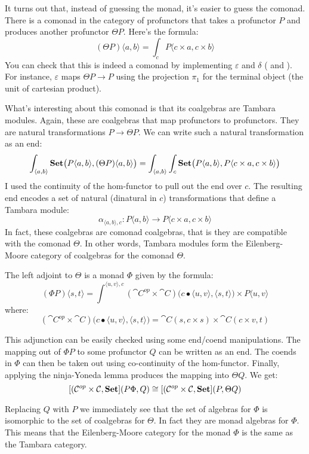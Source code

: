 \documentclass[DaoFP]{subfiles}
\begin{document}
It turns out that, instead of guessing the monad, it's easier to guess the comonad. There is a comonad in the category of profunctors that takes a profunctor $P$ and produces another profunctor $\Theta P$. Here's the formula:
\[(\Theta P) \langle a, b \rangle = \int_c P \langle c \times a, c \times b \rangle \]
You can check that this is indeed a comonad by implementing $\varepsilon$ and $\delta$ ( and ). For instance, $\varepsilon$ maps $\Theta P \to P$ using the projection $\pi_1$ for the terminal object (the unit of cartesian product).

What's interesting about this comonad is that its coalgebras are Tambara modules. Again, these are coalgebras that map profunctors to profunctors. They are natural transformations $P \to \Theta P$. We can write such a natural transformation as an end:
\[\int_{\langle a, b \rangle} \mathbf{Set} \big (P \langle a, b \rangle, (\Theta P) \langle a, b \rangle \big) = \int_{\langle a, b \rangle} \int_c \mathbf{Set} \big( P\langle a, b \rangle , P \langle c \times a, c \times b \rangle \big) \]
I used the continuity of the hom-functor to pull out the end over $c$. The resulting end encodes a set of natural (dinatural in $c$) transformations that define a Tambara module:
\[ \alpha_{\langle a, b\rangle, c} \colon P \langle a, b \rangle \to P \langle c \times a, c \times b \rangle \]
In fact, these coalgebras are comonad coalgebras, that is they are compatible with the comonad $\Theta$. In other words, Tambara modules form the Eilenberg-Moore category of coalgebras for the comonad $\Theta$.

The left adjoint to $\Theta$ is a monad $\Phi$ given by the formula:
\[(\Phi P)  \langle s, t \rangle = \int^{\langle u, v \rangle, c} (\cat C^{op} \times \cat C) \big(c \bullet \langle u, v\rangle , \langle s, t \rangle\big) \times P \langle u, v \rangle \]
where:
\[ (\cat C^{op} \times \cat C) \big(c \bullet \langle u, v\rangle , \langle s, t \rangle\big) = \cat C(s, c \times s) \times \cat C(c \times v, t) \]

This adjunction can be easily checked using some end/coend manipulations. The mapping out of $\Phi P$ to some profunctor $Q$ can be written as an end. The coends in $\Phi$ can then be taken out using co-continuity of the hom-functor. Finally, applying the ninja-Yoneda lemma produces the mapping into $\Theta Q$. We get:
\[ [(\mathcal{C}^{op} \times \mathcal{C}, \mathbf{Set}] (P \Phi, Q) \cong [(\mathcal{C}^{op} \times \mathcal{C}, \mathbf{Set}] (P, \Theta Q) \]

Replacing $Q$ with $P$ we immediately see that the set of algebras for $\Phi$ is isomorphic to the set of coalgebras for $\Theta$. In fact they are monad algebras for $\Phi$. This means that the Eilenberg-Moore category for the monad $\Phi$ is the same as the Tambara category.
\end{document}

